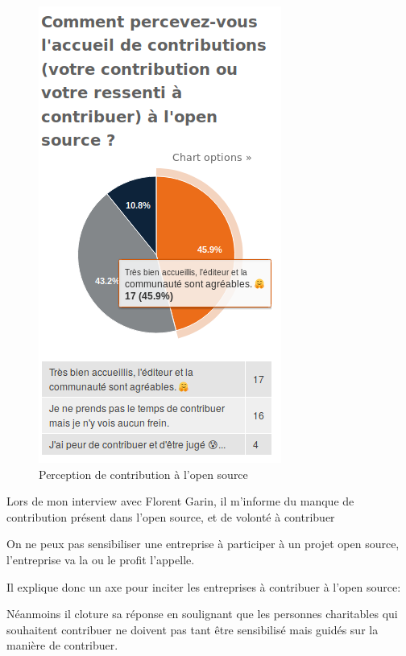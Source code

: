 			\begin{figure}[!htb]
				\center
				\includegraphics[scale=0.58]{./img/a7}
				\caption{Perception de contribution à l'open source}					
			\end{figure}

			Lors de mon interview avec Florent Garin, il m'informe du manque de contribution présent dans l'open source, et de volonté à contribuer

			On ne peux pas sensibiliser une entreprise à participer à un projet open source, l'entreprise va la ou le profit l'appelle. 

			Il explique donc un axe pour inciter les entreprises à contribuer à l'open source:

			\begin{center}
				\textit{
				}
			\end{center}

			Néanmoins il cloture sa réponse en soulignant que les personnes charitables qui souhaitent contribuer ne doivent pas tant être sensibilisé mais guidés sur la manière de contribuer.

